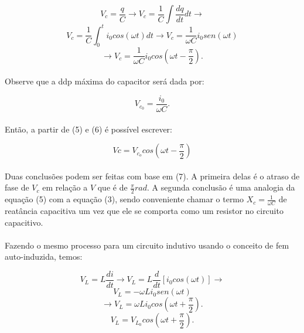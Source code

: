 \documentclass[a4paper, 12pt]{article}
\begin{document}
\begin{multicols}{2}
\begin{equation}
V_c = \frac{q}{C} \rightarrow V_c = \frac{1}{C} \int \frac{dq}{dt} dt \rightarrow 
\nonumber
\end{equation}
\begin{equation}
V_c = \frac{1}{C} \int_0 ^t i_0cos(\omega t)dt \rightarrow V_c = \frac{1}{\omega C} i_0sen(\omega t) 
\nonumber
\end{equation}
\begin{equation}
\rightarrow V_c = \frac{1}{\omega C}i_0cos(\omega t - \frac{\pi}{2}).
\end{equation}

\paragraph{} Observe que a ddp máxima do capacitor será dada por:

\begin{equation}
V_{c_0} = \frac{i_0}{\omega C}.
\end{equation}

\paragraph{} Então, a partir de (5) e (6) é possível escrever:

\begin{equation}
Vc = V_{c_o} cos(\omega t - \frac{\pi}{2})
\end{equation}

\paragraph{} Duas conclusões podem ser feitas com base em (7). A primeira delas é o atraso de fase de $V_c$ em relação a $V$ que é de $\frac{\pi}{2} rad$. A segunda conclusão é uma analogia da equação (5) com a equação (3), sendo conveniente chamar o termo $X_c = \frac{1}{\omega C}$ de reatância capacitiva um vez que ele se comporta como um resistor no circuito capacitivo.

\paragraph{} Fazendo o mesmo processo para um circuito indutivo usando o conceito de fem auto-induzida, temos:

\begin{equation}
V_L = L\frac{di}{dt} \rightarrow V_L = L \frac{d}{dt}[i_0cos(\omega t)] \rightarrow 
\nonumber
\end{equation}
\begin{equation}
V_L = -\omega L i_0sen(\omega t)
\nonumber
\end{equation}
\begin{equation}
\rightarrow V_L = \omega Li_0cos(\omega t + \frac{\pi}{2}).
\end{equation}
\begin{equation}
V_L = V_{L_0}cos(\omega t + \frac{\pi}{2}).
\end{equation}


\end{multicols}
\end{document}
